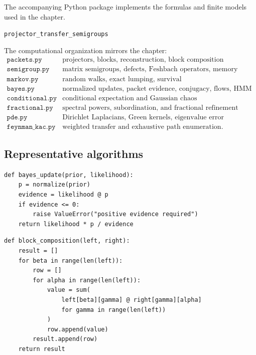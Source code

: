 \documentclass[11pt,letterpaper]{article}
\theoremstyle{plain}
\theoremstyle{plain}
\theoremstyle{plain}
\theoremstyle{definition}
\theoremstyle{definition}
\theoremstyle{definition}
\theoremstyle{definition}
\theoremstyle{definition}
\theoremstyle{remark}
\theoremstyle{remark}
\theoremstyle{remark}
\theoremstyle{remark}
\theoremstyle{remark}
\theoremstyle{remark}
\begin{document}
The accompanying Python package implements the formulas and finite models used in the chapter.
\begin{center}
\texttt{projector\_transfer\_semigroups}
\end{center}
The computational organization mirrors the chapter:
\[
\begin{array}{c|l}
\texttt{packets.py} & \text{projectors, blocks, reconstruction, block composition}\\
\texttt{semigroup.py} & \text{matrix semigroups, defects, Feshbach operators, memory}\\
\texttt{markov.py} & \text{random walks, exact lumping, survival}\\
\texttt{bayes.py} & \text{normalized updates, packet evidence, conjugacy, flows, HMM}\\
\texttt{conditional.py} & \text{conditional expectation and Gaussian chaos}\\
\texttt{fractional.py} & \text{spectral powers, subordination, and fractional refinement certificates}\\
\texttt{pde.py} & \text{Dirichlet Laplacians, Green kernels, eigenvalue error}\\
\texttt{feynman\_kac.py} & \text{weighted transfer and exhaustive path enumeration}.
\end{array}
\]

\subsection{Representative algorithms}

\begin{lstlisting}[caption={Normalized finite Bayesian update.}]
def bayes_update(prior, likelihood):
    p = normalize(prior)
    evidence = likelihood @ p
    if evidence <= 0:
        raise ValueError("positive evidence required")
    return likelihood * p / evidence
\end{lstlisting}

\begin{lstlisting}[caption={Packet block composition.}]
def block_composition(left, right):
    result = []
    for beta in range(len(left)):
        row = []
        for alpha in range(len(left)):
            value = sum(
                left[beta][gamma] @ right[gamma][alpha]
                for gamma in range(len(left))
            )
            row.append(value)
        result.append(row)
    return result
\end{lstlisting}
\end{document}
